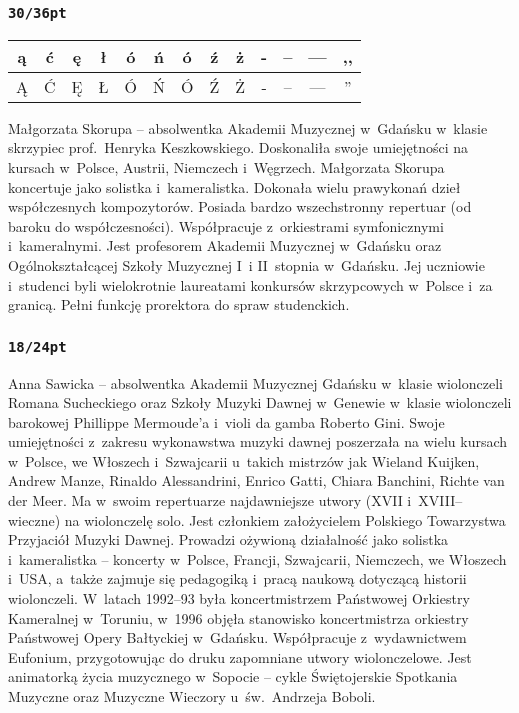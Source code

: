 \documentclass[twoside,a4page]{article}
\begin{document}
\subsubsection*{\tt 30/36pt}
\fontsize{30pt}{36pt}\selectfont

\begin{tabular}{|c|c|c|c|c|c|c|c|c|c|c|c|c|}\hline
ą & ć & ę & ł & ó & ń & ó & ź & ż & - &  -- &  --- &  ,, \\ \hline
Ą & Ć & Ę & Ł & Ó & Ń & Ó & Ź & Ż & - &  -- &  --- &  '' \\ \hline
\end{tabular}

Małgorzata Skorupa – absolwentka Akademii Muzycznej w~Gdańsku w~klasie
skrzypiec prof.~Henryka Keszkowskiego. Doskonaliła swoje umiejętności
na kursach w~Polsce, Austrii, Niemczech i~Węgrzech. Małgorzata Skorupa
koncertuje jako solistka i~kameralistka. Dokonała wielu prawykonań
dzieł współczesnych kompozytorów. Posiada bardzo wszechstronny
repertuar (od baroku do współczesności). Współpracuje z~orkiestrami
symfonicznymi i~kameralnymi. Jest profesorem Akademii Muzycznej
w~Gdańsku oraz Ogólnokształcącej Szkoły Muzycznej I~i II~stopnia
w~Gdańsku. Jej uczniowie i~studenci byli wielokrotnie laureatami
konkursów skrzypcowych w~Polsce i~za granicą. Pełni funkcję prorektora
do spraw studenckich.

\subsubsection*{\tt 18/24pt}
\fontsize{24pt}{30pt}\selectfont

Anna Sawicka – absolwentka Akademii Muzycznej Gdańsku w~klasie
wiolonczeli Romana Sucheckiego oraz Szkoły Muzyki Dawnej w~Genewie
w~klasie wiolonczeli barokowej Phillippe Mermoude'a i~violi da gamba
Roberto Gini. Swoje umiejętności z~zakresu wykonawstwa muzyki dawnej
poszerzała na wielu kursach w~Polsce, we Włoszech i~Szwajcarii
u~takich mistrzów jak Wieland Kuijken, Andrew Manze, Rinaldo
Alessandrini, Enrico Gatti, Chiara Banchini, Richte van der Meer.
Ma w~swoim repertuarze najdawniejsze utwory (XVII i~XVIII–wieczne) na
wiolonczelę solo. Jest członkiem założycielem Polskiego Towarzystwa
Przyjaciół Muzyki Dawnej. Prowadzi ożywioną działalność jako solistka
i~kameralistka – koncerty w~Polsce, Francji, Szwajcarii, Niemczech, we
Włoszech i~USA, a~także zajmuje się pedagogiką i~pracą naukową
dotyczącą historii wiolonczeli. W~latach 1992–93 była
koncertmistrzem Państwowej Orkiestry Kameralnej w~Toruniu, w~1996
objęła stanowisko koncertmistrza orkiestry Państwowej Opery Bałtyckiej
w~Gdańsku. Współpracuje z~wydawnictwem Eufonium, przygotowując do
druku zapomniane utwory wiolonczelowe. Jest animatorką życia
muzycznego w~Sopocie – cykle Świętojerskie Spotkania Muzyczne
oraz Muzyczne Wieczory u~św.~Andrzeja Boboli.
\end{document}
